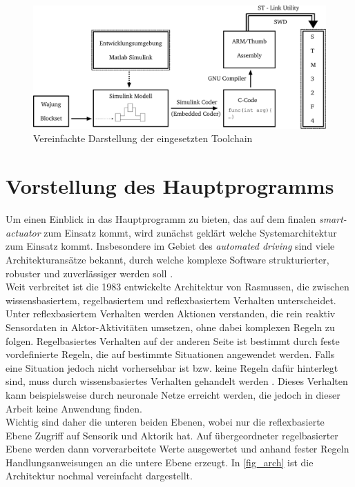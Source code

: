 \begin{figure}[H]%
\centering
\includegraphics[width=0.8\columnwidth]{./Bilder/fig_toolchain}%
\caption{Vereinfachte Darstellung der eingesetzten Toolchain}%
\label{fig_toolchain}%
\end{figure}

\section{Vorstellung des Hauptprogramms}
Um einen Einblick in das Hauptprogramm zu bieten, das auf dem finalen \textit{smart-actuator} zum Einsatz kommt, wird zunächst geklärt welche Systemarchitektur zum Einsatz kommt.
Insbesondere im Gebiet des \textit{automated driving} sind viele Architekturansätze bekannt, durch welche komplexe Software strukturierter, robuster und zuverlässiger werden soll \cite{automated}.\\
 Weit verbreitet ist die 1983 entwickelte Architektur von Rasmussen, die zwischen wissensbasiertem, regelbasiertem und reflexbasiertem Verhalten unterscheidet. Unter reflexbasiertem Verhalten werden Aktionen verstanden, die rein reaktiv Sensordaten in Aktor-Aktivitäten umsetzen, ohne dabei komplexen Regeln zu folgen. Regelbasiertes Verhalten auf der anderen Seite ist bestimmt durch feste vordefinierte Regeln, die auf bestimmte Situationen angewendet werden. Falls eine Situation jedoch nicht vorhersehbar ist bzw. keine Regeln dafür hinterlegt sind, muss durch wissensbasiertes Verhalten gehandelt werden . Dieses Verhalten kann beispielsweise durch neuronale Netze erreicht werden, die jedoch in dieser Arbeit keine Anwendung finden. \cite{Rasmussen}\\
Wichtig sind daher die unteren beiden Ebenen, wobei nur die reflexbasierte Ebene Zugriff auf Sensorik und Aktorik hat. Auf übergeordneter regelbasierter Ebene werden dann vorverarbeitete Werte ausgewertet und anhand fester Regeln Handlungsanweisungen an die untere Ebene erzeugt. In \autoref{fig_arch} ist die Architektur nochmal vereinfacht dargestellt.
